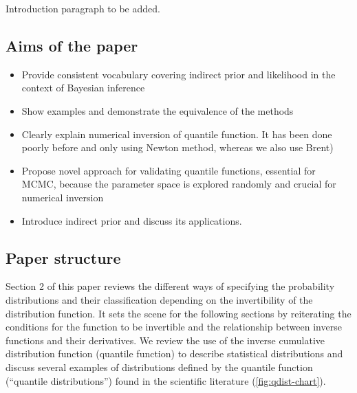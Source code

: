 \documentclass[
  12pt,
]{article}
\providecommand{\tightlist}{%
  \setlength{\itemsep}{0pt}\setlength{\parskip}{0pt}}
\begin{document}
Introduction paragraph to be added.

\hypertarget{aims-of-the-paper}{%
\subsection{Aims of the paper}\label{aims-of-the-paper}}

\begin{itemize}
\tightlist
\item
  Provide consistent vocabulary covering indirect prior and likelihood in the context of Bayesian inference
\item
  Show examples and demonstrate the equivalence of the methods
\item
  Clearly explain numerical inversion of quantile function. It has been done poorly before and only using Newton method, whereas we also use Brent)
\item
  Propose novel approach for validating quantile functions, essential for MCMC, because the parameter space is explored randomly and crucial for numerical inversion
\item
  Introduce indirect prior and discuss its applications.
\end{itemize}

\hypertarget{paper-structure}{%
\subsection{Paper structure}\label{paper-structure}}

Section 2 of this paper reviews the different ways of specifying the probability distributions and their classification depending on the invertibility of the distribution function. It sets the scene for the following sections by reiterating the conditions for the function to be invertible and the relationship between inverse functions and their derivatives. We review the use of the inverse cumulative distribution function (quantile function) to describe statistical distributions and discuss several examples of distributions defined by the quantile function (``quantile distributions'') found in the scientific literature (\ref{fig:qdist-chart}).
\end{document}
